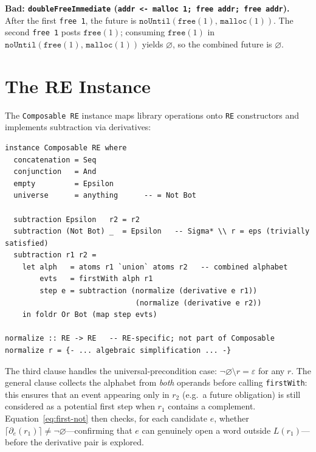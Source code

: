 \documentclass[acmsmall,screen]{acmart}
\newcommand{\noUntil}[2]{\mathtt{noUntil}(#1,\,#2)}
\newcommand{\univ}{\neg\varnothing}
\begin{document}
\noindent\textbf{Bad: \lstinline{doubleFreeImmediate} (\lstinline{addr <- malloc 1; free addr; free addr}).}
After the first \lstinline{free 1}, the future is
$\noUntil{\mathtt{free}(1)}{\mathtt{malloc}(1)}$.
The second \lstinline{free 1} posts $\mathtt{free}(1)$; consuming
$\mathtt{free}(1)$ in $\noUntil{\mathtt{free}(1)}{\mathtt{malloc}(1)}$
yields $\varnothing$, so the combined future is $\varnothing$.\ \texttimes

\section{The RE Instance}
\label{sec:re-instance}

The \lstinline{Composable RE} instance maps library operations onto
\lstinline{RE} constructors and implements subtraction via derivatives:

\begin{lstlisting}
instance Composable RE where
  concatenation = Seq
  conjunction   = And
  empty         = Epsilon
  universe      = anything      -- = Not Bot

  subtraction Epsilon   r2 = r2
  subtraction (Not Bot) _  = Epsilon   -- Sigma* \\ r = eps (trivially satisfied)
  subtraction r1 r2 =
    let alph   = atoms r1 `union` atoms r2   -- combined alphabet
        evts   = firstWith alph r1
        step e = subtraction (normalize (derivative e r1))
                              (normalize (derivative e r2))
    in foldr Or Bot (map step evts)

normalize :: RE -> RE   -- RE-specific; not part of Composable
normalize r = {- ... algebraic simplification ... -}
\end{lstlisting}

The third clause handles the universal-precondition case:
$\univ \setminus r = \varepsilon$ for any $r$.
The general clause collects the alphabet from \emph{both} operands
before calling \lstinline{firstWith}: this ensures that an event
appearing only in $r_2$ (e.g.\ a future obligation) is still considered
as a potential first step when $r_1$ contains a complement.
Equation~\eqref{eq:first-not} then checks, for each candidate $e$,
whether $\lceil\partial_e(r_1)\rceil \neq \univ$---confirming that
$e$ can genuinely open a word outside $L(r_1)$---before the
derivative pair is explored.
\end{document}
